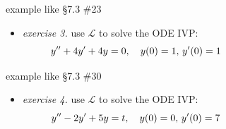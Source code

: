 \documentclass[urlcolor=blue,dvipsnames]{beamer}
\begin{document}
\begin{frame}{example like \S7.3 \#23}

\begin{itemize}
\item \emph{exercise 3.} use $\mathcal{L}$ to solve the ODE IVP:
    $$y''+4y'+4y=0, \quad y(0)=1, \, y'(0)=1 \hspace{40mm}$$

\vspace{60mm}
\end{itemize}
\end{frame}


\begin{frame}{example like \S7.3 \#30}

\begin{itemize}
\item \emph{exercise 4.} use $\mathcal{L}$ to solve the ODE IVP:
    $$y''-2y'+5y=t, \quad y(0)=0, \, y'(0)=7 \hspace{40mm}$$

\vspace{60mm}
\end{itemize}
\end{frame}

\newcommand{\UU}{\mathcal{U}}
\end{document}
